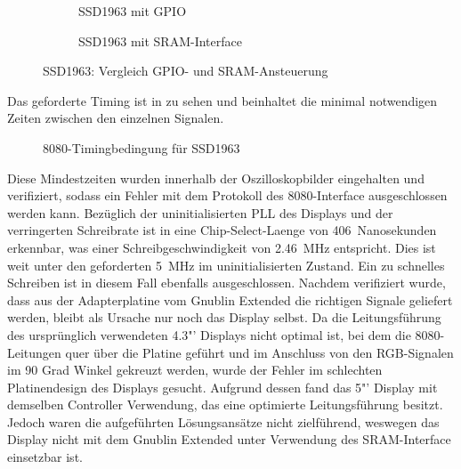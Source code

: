 \begin{figure}[htp]
        \begin{center}
        \begin{subfigure}[htp]{1\textwidth}
			\centering
	\caption{SSD1963 mit GPIO}
			\label{fig:ssd1963_gpio}
		\end{subfigure}


        \begin{subfigure}[htp]{1\textwidth}
	\centering
{}
	\caption{SSD1963 mit SRAM-Interface}
	\label{fig:ssd1963_sram}
\end{subfigure}

		\end{center}
\caption{SSD1963: Vergleich GPIO- und SRAM-Ansteuerung}
	\label{fig:ssd1963_gpio_sram}
\end{figure}
\newpage
Das geforderte Timing ist in  zu sehen und beinhaltet die minimal notwendigen Zeiten zwischen den einzelnen Signalen.
\begin{figure}[htp]
	\centering
{}
	\caption{8080-Timingbedingung für SSD1963}
	\label{fig:ssd1963_timing_constraints}
\end{figure}
Diese Mindestzeiten wurden innerhalb der Oszilloskopbilder eingehalten und verifiziert, sodass ein Fehler mit dem Protokoll des 8080-Interface ausgeschlossen werden kann. Bezüglich der uninitialisierten PLL des Displays und der verringerten Schreibrate ist in  eine Chip-Select-Laenge von 406~Nanosekunden erkennbar, was einer Schreibgeschwindigkeit von 2.46~MHz entspricht. Dies ist weit unter den geforderten 5~MHz im uninitialisierten Zustand. Ein zu schnelles Schreiben ist in diesem Fall ebenfalls ausgeschlossen. Nachdem verifiziert wurde, dass aus der Adapterplatine vom Gnublin Extended die richtigen Signale geliefert werden, bleibt als Ursache nur noch das Display selbst. Da die Leitungsführung des ursprünglich verwendeten 4.3"' Displays nicht optimal ist, bei dem die 8080-Leitungen quer über die Platine geführt und im Anschluss von den RGB-Signalen im 90 Grad Winkel gekreuzt werden, wurde der Fehler im schlechten Platinendesign des Displays gesucht. Aufgrund dessen fand das 5"' Display mit demselben Controller Verwendung, das eine optimierte Leitungsführung besitzt. Jedoch waren die aufgeführten Lösungsansätze nicht zielführend, weswegen das Display nicht mit dem Gnublin Extended unter Verwendung des SRAM-Interface einsetzbar ist.